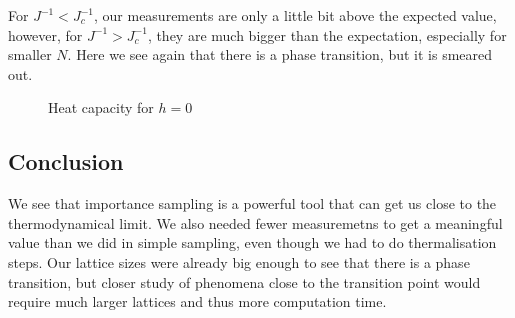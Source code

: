 \documentclass{scrartcl}
\begin{document}
For $J^{-1}<J_c^{-1}$, our measurements are only a little bit above the expected value, however, for $J^{-1}>J_c^{-1}$, they are much bigger than the expectation, especially for smaller $N$. Here we see again that there is a phase transition, but it is smeared out.

	\begin{figure}[htbp]
		
		\caption{Heat capacity for $h=0$}
		\label{fig:heat}
	\end{figure}
	
\subsection{Conclusion}
We see that importance sampling is a powerful tool that can get us close to the thermodynamical limit. We also needed fewer measuremetns to get a meaningful value than we did in simple sampling, even though we had to do thermalisation steps. Our lattice sizes were already big enough to see that there is a phase transition, but closer study of phenomena close to the transition point would require much larger lattices and thus more computation time.





\newpage	
\listoffigures
\printbibliography
\end{document}
